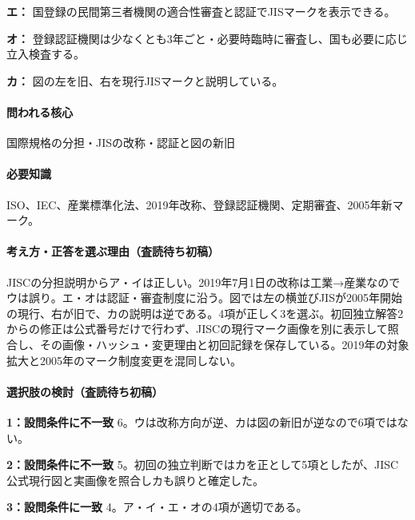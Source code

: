 \noindent\textbf{エ：} 国登録の民間第三者機関の適合性審査と認証でJISマークを表示できる。\par

\noindent\textbf{オ：} 登録認証機関は少なくとも3年ごと・必要時臨時に審査し、国も必要に応じ立入検査する。\par

\noindent\textbf{カ：} 図の左を旧、右を現行JISマークと説明している。\par

\paragraph{問われる核心} 国際規格の分担・JISの改称・認証と図の新旧

\paragraph{必要知識} ISO、IEC、産業標準化法、2019年改称、登録認証機関、定期審査、2005年新マーク。

\paragraph{考え方・正答を選ぶ理由（査読待ち初稿）} JISCの分担説明からア・イは正しい。2019年7月1日の改称は工業→産業なのでウは誤り。エ・オは認証・審査制度に沿う。図では左の横並びJISが2005年開始の現行、右が旧で、カの説明は逆である。4項が正しく3を選ぶ。初回独立解答2からの修正は公式番号だけで行わず、JISCの現行マーク画像を別に表示して照合し、その画像・ハッシュ・変更理由と初回記録を保存している。2019年の対象拡大と2005年のマーク制度変更を混同しない。

\paragraph{選択肢の検討（査読待ち初稿）}\mbox{}\par

\noindent\textbf{1：設問条件に不一致} 6。ウは改称方向が逆、カは図の新旧が逆なので6項ではない。\par

\noindent\textbf{2：設問条件に不一致} 5。初回の独立判断ではカを正として5項としたが、JISC公式現行図と実画像を照合しカも誤りと確定した。\par

\noindent\textbf{3：設問条件に一致} 4。ア・イ・エ・オの4項が適切である。\par

